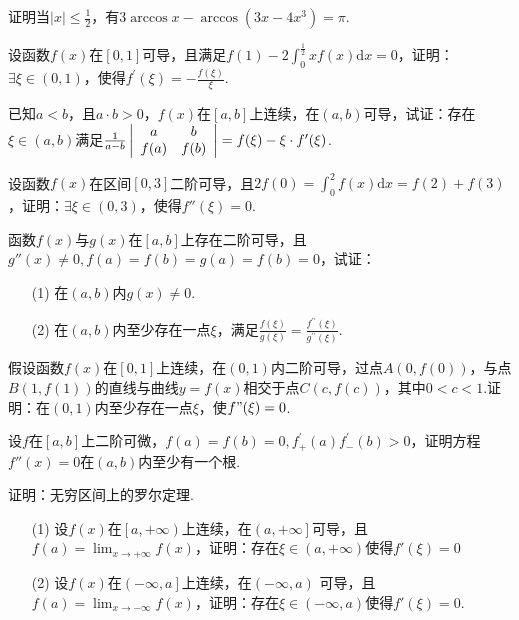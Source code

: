\begin{xiti}
	\item 证明当$| x | \leqslant \frac { 1 } { 2 }$，有$3 \arccos x - \arccos \left( 3 x - 4 x ^ { 3 } \right) = \pi$.
	\item 设函数$f(x)$在$[0,1]$可导，且满足$f ( 1 ) - 2 \int _ { 0 } ^ { \frac { 1 } { 2 } } x f ( x ) \mathrm { d } x = 0$，证明：$\exists \xi \in (0,1)$，使得$f ^ { \prime } ( \xi ) = - \frac { f ( \xi ) } { \xi }$.
	\item 已知$a<b$，且$a\cdot b>0$，$f(x)$在$[a,b]$上连续，在$(a,b)$可导，试证：存在$\xi \in(a,b)$满足$\frac { 1 } { a - b } \left| \begin{array} { c c } { a } & { b } \\ { f ( a ) } & { f ( b ) } \end{array} \right| = f ( \xi ) - \xi \cdot f ^ { \prime } ( \xi )$.
	\item 设函数$f(x)$在区间$[0,3]$二阶可导，且$2 f ( 0 ) = \int _ { 0 } ^ { 2 } f ( x ) \mathrm { d } x = f ( 2 ) + f ( 3 )$，证明：$\exists \xi \in(0,3)$，使得$f''(\xi )=0$.
	\item 函数$f(x)$与$g(x)$在$[a,b]$上存在二阶可导，且$g''(x)\ne 0,f ( a ) = f ( b ) = g ( a ) = f ( b ) = 0$，试证：
	\begin{enumerate}
		\item[(1)] 在$(a,b)$内$g(x)\ne 0$.
		\item[(2)] 在$(a,b)$内至少存在一点$\xi $，满足$\frac { f ( \xi ) } { g ( \xi ) } = \frac { f ^ { \prime \prime } ( \xi ) } { g ^ { \prime \prime } ( \xi ) }$.
	\end{enumerate}
	\item 假设函数$f(x)$在$[0,1]$上连续，在$(0,1)$内二阶可导，过点$A(0,f(0))$，与点$B(1,f(1))$的直线与曲线$y=f(x)$相交于点$C(c,f(c))$，其中$0<c<1$.证明：在$(0,1)$内至少存在一点$\xi $，使$f"(\xi)=0$.
	\item 设$f$在$[a,b]$上二阶可微，$f(a)=f(b)=0,f _ { + } ^ { \prime } ( a ) f _ { - } ^ { \prime } ( b ) > 0$，证明方程$f''(x)=0$在$(a,b)$内至少有一个根.
	\item 证明：无穷区间上的罗尔定理.
	\begin{enumerate}
		\item[(1)] 设$f(x)$在$\left[ a,+\infty\right) $上连续，在$\left( a,+\infty\right] $可导，且$f ( a ) = \lim _ { x \rightarrow + \infty } f ( x )$，证明：存在$\xi \in(a,+\infty)$使得$f'(\xi )=0$
		\item[(2)] 设$f(x)$在$\left( -\infty ,a\right]  $上连续，在$\left( -\infty ,a\right)  $ 可导，且$f(a)=\lim _ { x \rightarrow -\infty } f ( x )$，证明：存在$\xi \in\left( -\infty ,a\right)$使得$f'(\xi )=0$.

\end{enumerate}
\end{xiti}
